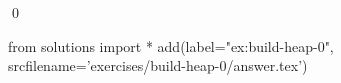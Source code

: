 
\begin{ex} 
  \label{ex:build-heap-0}
  
  \qed
\end{ex} 
\begin{python0}
from solutions import *
add(label="ex:build-heap-0",
    srcfilename='exercises/build-heap-0/answer.tex') 
\end{python0}
